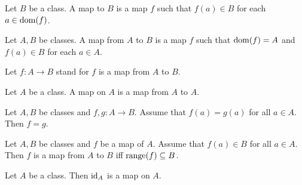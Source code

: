 \documentclass[../../set-theory/set-theory.tex]{subfiles}
\begin{document}
  \begin{forthel}
    \begin{definition}
      Let $B$ be a class.
      A map to $B$ is a map $f$ such that $f(a) \in B$ for each $a \in \operatorname{dom}(f)$.
    \end{definition}
  \end{forthel}

  \begin{forthel}
    \begin{definition}
      Let $A, B$ be classes.
      A map from $A$ to $B$ is a map $f$ such that $\operatorname{dom}(f) = A$ and
      $f(a) \in B$ for each $a \in A$.
    \end{definition}

    Let $f: A \to B$ stand for $f$ is a map from $A$ to $B$.
  \end{forthel}

  \begin{forthel}
    \begin{definition}
      Let $A$ be a class.
      A map on $A$ is a map from $A$ to $A$.
    \end{definition}
  \end{forthel}

  \begin{forthel}
    \begin{proposition}
      Let $A, B$ be classes and $f, g : A \to B$.
      Assume that $f(a) = g(a)$ for all $a \in A$.
      Then $f = g$.
    \end{proposition}
  \end{forthel}

  \begin{forthel}
    \begin{proposition}
      Let $A, B$ be classes and $f$ be a map of $A$.
      Assume that $f(a) \in B$ for all $a \in A$.
      Then $f$ is a map from $A$ to $B$ iff $\operatorname{range}(f) \subseteq B$.
    \end{proposition}
  \end{forthel}

  \begin{forthel}
    \begin{proposition}
      Let $A$ be a class.
      Then $\operatorname{id}_{A}$ is a map on $A$.
    \end{proposition}
  \end{forthel}
\end{document}
